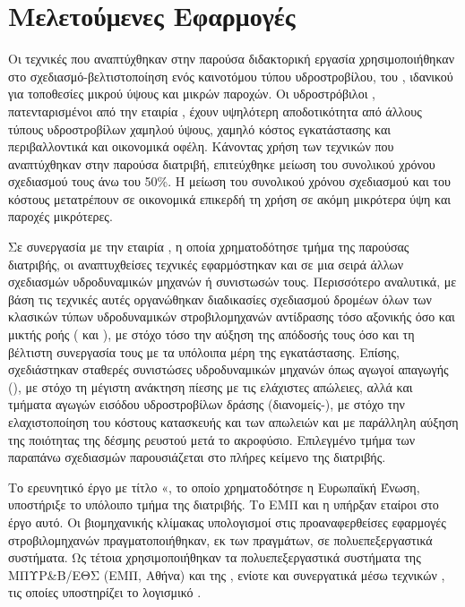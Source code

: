 \section{Μελετούμενες Εφαρμογές}
Οι τεχνικές που αναπτύχθηκαν στην παρούσα διδακτορική εργασία χρησιμοποιήθηκαν στο σχεδιασμό-βελτιστοποίηση ενός καινοτόμου τύπου υδροστροβίλου, του  , ιδανικού για τοποθεσίες μικρού ύψους και μικρών παροχών. Οι υδροστρόβιλοι , πατενταρισμένοι από την εταιρία , έχουν υψηλότερη αποδοτικότητα από άλλους τύπους υδροστροβίλων χαμηλού ύψους, χαμηλό κόστος εγκατάστασης και περιβαλλοντικά και οικονομικά οφέλη. Κάνοντας χρήση των τεχνικών που αναπτύχθηκαν στην παρούσα διατριβή, επιτεύχθηκε μείωση του συνολικού χρόνου σχεδιασμού τους άνω του 50\%.  Η μείωση του συνολικού χρόνου σχεδιασμού και του κόστους μετατρέπουν σε οικονομικά επικερδή τη χρήση  σε ακόμη μικρότερα ύψη και παροχές μικρότερες. 

Σε συνεργασία με την εταιρία , η οποία χρηματοδότησε τμήμα της  παρούσας διατριβής, οι αναπτυχθείσες τεχνικές εφαρμόστηκαν και σε μια σειρά άλλων σχεδιασμών υδροδυναμικών μηχανών ή συνιστωσών τους. Περισσότερο αναλυτικά, με βάση τις τεχνικές αυτές οργανώθηκαν διαδικασίες σχεδιασμού δρομέων όλων των κλασικών τύπων υδροδυναμικών στροβιλομηχανών αντίδρασης τόσο αξονικής όσο και μικτής ροής ( και ), με στόχο τόσο την αύξηση της απόδοσής τους όσο και τη βέλτιστη συνεργασία τους με τα υπόλοιπα μέρη της εγκατάστασης. Επίσης, σχεδιάστηκαν σταθερές συνιστώσες υδροδυναμικών μηχανών όπως αγωγοί απαγωγής (), με στόχο τη μέγιστη ανάκτηση πίεσης με τις ελάχιστες απώλειες, αλλά και τμήματα αγωγών εισόδου υδροστροβίλων δράσης (διανομείς-), με στόχο την ελαχιστοποίηση του κόστους κατασκευής και των απωλειών και με παράλληλη αύξηση της ποιότητας της δέσμης ρευστού μετά το ακροφύσιο. Επιλεγμένο τμήμα των παραπάνω σχεδιασμών παρουσιάζεται στο πλήρες κείμενο της διατριβής. 
		
Το ερευνητικό  έργο με τίτλο «, το οποίο χρηματοδότησε η Ευρωπαϊκή Ένωση, υποστήριξε το υπόλοιπο τμήμα της διατριβής. Το ΕΜΠ και η  υπήρξαν εταίροι στο έργο αυτό. Οι βιομηχανικής κλίμακας υπολογισμοί στις προαναφερθείσες εφαρμογές  στροβιλομηχανών πραγματοποιήθηκαν, εκ των πραγμάτων, σε πολυεπεξεργαστικά συστήματα. Ως τέτοια χρησιμοποιήθηκαν τα πολυεπεξεργαστικά συστήματα της ΜΠΥΡ\&Β/ΕΘΣ (ΕΜΠ, Αθήνα) και της , ενίοτε και συνεργατικά μέσω τεχνικών  \cite{phd_Liakopoulos}, τις οποίες υποστηρίζει το λογισμικό . 

